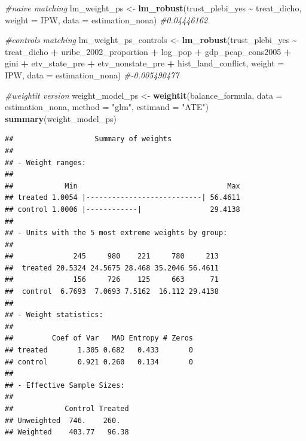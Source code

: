 \documentclass[
]{article}
\newenvironment{Shaded}{\begin{snugshade}}{\end{snugshade}}
\newcommand{\AttributeTok}[1]{\textcolor[rgb]{0.13,0.29,0.53}{#1}}
\newcommand{\CommentTok}[1]{\textcolor[rgb]{0.56,0.35,0.01}{\textit{#1}}}
\newcommand{\FunctionTok}[1]{\textcolor[rgb]{0.13,0.29,0.53}{\textbf{#1}}}
\newcommand{\NormalTok}[1]{#1}
\newcommand{\OtherTok}[1]{\textcolor[rgb]{0.56,0.35,0.01}{#1}}
\newcommand{\SpecialCharTok}[1]{\textcolor[rgb]{0.81,0.36,0.00}{\textbf{#1}}}
\newcommand{\StringTok}[1]{\textcolor[rgb]{0.31,0.60,0.02}{#1}}
\begin{document}
\begin{Shaded}
\begin{Highlighting}[]
\CommentTok{\#naive matching}
\NormalTok{lm\_weight\_ps }\OtherTok{\textless{}{-}} \FunctionTok{lm\_robust}\NormalTok{(trust\_plebi\_yes }\SpecialCharTok{\textasciitilde{}}\NormalTok{ treat\_dicho, }\AttributeTok{weight =}\NormalTok{ IPW, }\AttributeTok{data =}\NormalTok{ estimation\_nona) }\CommentTok{\#0.04446162}

\CommentTok{\#controls matching}
\NormalTok{lm\_weight\_ps\_controls }\OtherTok{\textless{}{-}} \FunctionTok{lm\_robust}\NormalTok{(trust\_plebi\_yes }\SpecialCharTok{\textasciitilde{}}\NormalTok{ treat\_dicho }\SpecialCharTok{+}\NormalTok{ uribe\_2002\_proportion }\SpecialCharTok{+}\NormalTok{ log\_pop }\SpecialCharTok{+}\NormalTok{ gdp\_pcap\_cons2005 }\SpecialCharTok{+}\NormalTok{  gini }\SpecialCharTok{+}\NormalTok{ etv\_state\_pre }\SpecialCharTok{+}\NormalTok{ etv\_nonstate\_pre }\SpecialCharTok{+}\NormalTok{ hist\_land\_conflict, }\AttributeTok{weight =}\NormalTok{ IPW, }\AttributeTok{data =}\NormalTok{ estimation\_nona) }\CommentTok{\#{-}0.005490477}
\end{Highlighting}
\end{Shaded}

\begin{Shaded}
\begin{Highlighting}[]
\CommentTok{\#weightit version}
\NormalTok{weight\_model\_ps }\OtherTok{\textless{}{-}} \FunctionTok{weightit}\NormalTok{(balance\_formula, }
                     \AttributeTok{data =}\NormalTok{ estimation\_nona, }
                     \AttributeTok{method =} \StringTok{"glm"}\NormalTok{, }
                     \AttributeTok{estimand =} \StringTok{"ATE"}\NormalTok{)}
\FunctionTok{summary}\NormalTok{(weight\_model\_ps)}
\end{Highlighting}
\end{Shaded}

\begin{verbatim}
##                   Summary of weights
## 
## - Weight ranges:
## 
##            Min                                   Max
## treated 1.0054 |---------------------------| 56.4611
## control 1.0006 |------------|                29.4138
## 
## - Units with the 5 most extreme weights by group:
##                                                
##              245     980    221     780     213
##  treated 20.5324 24.5675 28.468 35.2046 56.4611
##              156     726    125     663      71
##  control  6.7693  7.0693 7.5162  16.112 29.4138
## 
## - Weight statistics:
## 
##         Coef of Var   MAD Entropy # Zeros
## treated       1.305 0.682   0.433       0
## control       0.921 0.260   0.134       0
## 
## - Effective Sample Sizes:
## 
##            Control Treated
## Unweighted  746.    260.  
## Weighted    403.77   96.38
\end{verbatim}
\end{document}
